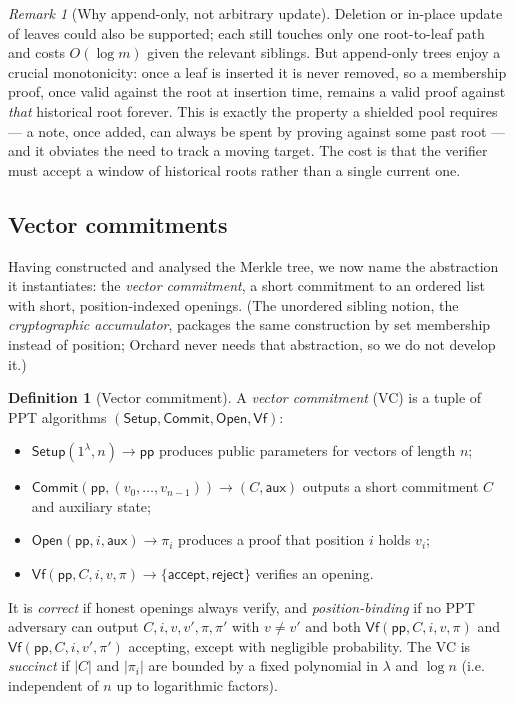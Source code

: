 \documentclass[11pt,a4paper]{article}
\theoremstyle{definition}
\newtheorem{definition}[theorem]{Definition}
\theoremstyle{remark}
\newtheorem{remark}[theorem]{Remark}
\begin{document}
\begin{remark}[Why append-only, not arbitrary update]\label{merkle:rem-append-only}
Deletion or in-place update of leaves could also be supported; each still touches only one root-to-leaf path and costs \(O(\log m)\) given the relevant siblings. But append-only trees enjoy a crucial monotonicity: once a leaf is inserted it is never removed, so a membership proof, once valid against the root at insertion time, remains a valid proof against \emph{that} historical root forever. This is exactly the property a shielded pool requires --- a note, once added, can always be spent by proving against some past root --- and it obviates the need to track a moving target. The cost is that the verifier must accept a window of historical roots rather than a single current one.
\end{remark}
\subsection{Vector commitments}\label{merkle:sec-vc}

Having constructed and analysed the Merkle tree, we now name the abstraction it instantiates: the \emph{vector commitment}, a short commitment to an ordered list with short, position-indexed openings. (The unordered sibling notion, the \emph{cryptographic accumulator}, packages the same construction by set membership instead of position; Orchard never needs that abstraction, so we do not develop it.)

\begin{definition}[Vector commitment]\label{merkle:def-vc}
A \emph{vector commitment} (VC) is a tuple of PPT algorithms \((\mathsf{Setup}, \mathsf{Commit}, \mathsf{Open}, \mathsf{Vf})\):
\begin{itemize}
\item \(\mathsf{Setup}(1^\lambda, n) \to \mathsf{pp}\) produces public parameters for vectors of length \(n\);
\item \(\mathsf{Commit}(\mathsf{pp}, (v_0, \dots, v_{n-1})) \to (C, \mathsf{aux})\) outputs a short commitment \(C\) and auxiliary state;
\item \(\mathsf{Open}(\mathsf{pp}, i, \mathsf{aux}) \to \pi_i\) produces a proof that position \(i\) holds \(v_i\);
\item \(\mathsf{Vf}(\mathsf{pp}, C, i, v, \pi) \to \{\mathsf{accept}, \mathsf{reject}\}\) verifies an opening.
\end{itemize}
It is \emph{correct} if honest openings always verify, and \emph{position-binding} if no PPT adversary can output \(C, i, v, v', \pi, \pi'\) with \(v \neq v'\) and both \(\mathsf{Vf}(\mathsf{pp},C,i,v,\pi)\) and \(\mathsf{Vf}(\mathsf{pp},C,i,v',\pi')\) accepting, except with negligible probability. The VC is \emph{succinct} if \(|C|\) and \(|\pi_i|\) are bounded by a fixed polynomial in \(\lambda\) and \(\log n\) (i.e. independent of \(n\) up to logarithmic factors).
\end{definition}
\end{document}
